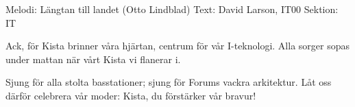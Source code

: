 \begin{song}

\begin{songmeta}
Melodi: Längtan till landet (Otto Lindblad)
Text: David Larson, IT00
Sektion: IT
\end{songmeta}

\begin{songtext}
Ack, för Kista brinner våra hjärtan,
centrum för vår I-teknologi.
Alla sorger sopas under mattan
när vårt Kista vi flanerar i.

Sjung för alla stolta basstationer;
sjung för Forums vackra arkitektur.
Låt oss därför celebrera vår moder:
Kista, du förstärker vår bravur!
\end{songtext}
\end{song}
